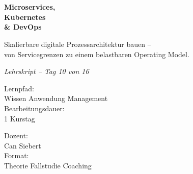 \documentclass[11pt,a4paper,oneside]{article}
\newcommand{\caveatfontfallback}{\itshape}
\newcommand\caveatfont{\caveatfontfallback}%
\begin{document}
\begin{titlepage}
  \pagestyle{empty}
  \vspace*{1.5cm}
  \\[2pt]
  \noindent{\color{lpAccent}\rule{\linewidth}{1.2pt}}\\[4pt]

  \vspace{3cm}
  {\sffamily\fontsize{30}{34}\selectfont\bfseries\color{lpInk}Microservices,\\Kubernetes\\\& DevOps\par}

  \vspace{0.7cm}
  {\sffamily\large\color{lpGray}Skalierbare digitale Prozessarchitektur bauen --\\von Servicegrenzen zu einem belastbaren Operating Model.\par}

  \vspace{1.5cm}
  {\caveatfont\LARGE\color{lpAmber}Lehrskript -- Tag 10 von 16}\par

  \vfill

  \noindent\begin{minipage}{0.55\linewidth}
    {\sffamily\footnotesize\color{lpGray}Lernpfad:}\\
    {\sffamily\small\color{lpInk}Wissen \textrightarrow{} Anwendung \textrightarrow{} Management}\\[10pt]
    {\sffamily\footnotesize\color{lpGray}Bearbeitungsdauer:}\\
    {\sffamily\small\color{lpInk}1 Kurstag}
  \end{minipage}\hfill
  \begin{minipage}{0.4\linewidth}
    \raggedleft
    {\sffamily\footnotesize\color{lpGray}Dozent:}\\
    {\sffamily\small\color{lpInk}Can Siebert}\\[10pt]
    {\sffamily\footnotesize\color{lpGray}Format:}\\
    {\sffamily\small\color{lpInk}Theorie \textperiodcentered{} Fallstudie \textperiodcentered{} Coaching}
  \end{minipage}

  \vspace{0.5cm}
  \noindent{\color{lpAccent}\rule{\linewidth}{0.6pt}}
\end{titlepage}
\end{document}
